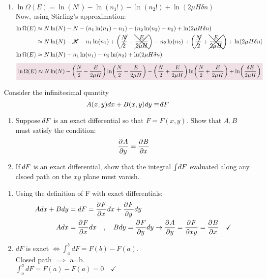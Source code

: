 \documentclass{article}
\def\dbar{{\mathchar'26\mkern-12mu d}} %
\begin{document}
\begin{problem}[Reif 2.4]
\begin{enumerate}[label=\alph*)]
            \item $\displaystyle\ln\Omega(E)=\ln(N!)-\ln(n_1!)-\ln(n_2!)+\ln(2\mu H\delta n)$
            \\ Now, using Stirling's approximation: 
            \begin{align*}
                \ln\Omega(E)&\approx N\ln(N)-N-(n_1\ln(n_1)-n_1)-(n_2\ln(n_2)-n_2)+\ln(2\mu H\delta n)
                \\
                &\approx N\ln(N)-\cancel{N}-n_1\ln(n_1)+\qty(\cancel{\frac{N}{2}}-\xcancel{\frac{E}{2\mu H}})-n_2\ln(n_2)+\qty(\cancel{\frac{N}{2}}+\xcancel{\frac{E}{2\mu H}})+\ln(2\mu H\delta n)
                \\
                \ln\Omega(E)&\approx N\ln(N)-n_1\ln(n_1)-n_2\ln(n_2)+\ln(2\mu H\delta n)
            \end{align*}
            \begin{align*}
                \coloredanswer{\ln\Omega(E)\approx N\ln(N)-\qty(\frac{N}{2}-\frac{E}{2\mu H})\ln(\frac{N}{2}-\frac{E}{2\mu H})-\qty(\frac{N}{2}+\frac{E}{2\mu H})\ln(\frac{N}{2}+\frac{E}{2\mu H})+\ln(\frac{\delta E}{2\mu H})}
            \end{align*}
        \end{enumerate}
    \end{problem}\newpage
    \begin{problem}[Reif 2.5]
        Consider the infinitesimal quantity $$A(x,y)dx+B(x,y)dy\equiv\dbar F$$
        \begin{enumerate}[label=(\alph*)]
            \item Suppose $\dbar F$ is an exact differential so that $F=F(x,y)$. Show that $A,B$ must satisfy the condition: $$\pder{A}{y}=\pder{B}{x}$$
            \item If $\dbar F$ is an exact differential, show that the integral $\int \dbar F$ evaluated along any clsoed path on the $xy$ plane must vanish.
        \end{enumerate}
        \answerline
        \begin{enumerate}[label=\alph*)]
            \item Using the definition of F with exact differentials:
            \begin{align*}
                Adx+Bdy&=dF=\pder{F}{x}dx+\pder{F}{y}dy
                \\
                Adx&=\pder{F}{x}dx 
                \quad,\quad
                Bdy=\pder{F}{y}dy
                \rightarrow
            \pder{A}{y}=\pder{F}{xy}=\pder{B}{x}\quad\checkmark
            \end{align*}
            \item $dF$ is exact $\iff\int_a^bdF=F(b)-F(a)$. 
            \\[0.25 cm]
            Closed path $\implies$ a=b.
            \\[0.25 cm]
            $\int_a^adF=F(a)-F(a)=0\quad\checkmark$
        \end{enumerate}
    \end{problem}\newpage
\end{document}
